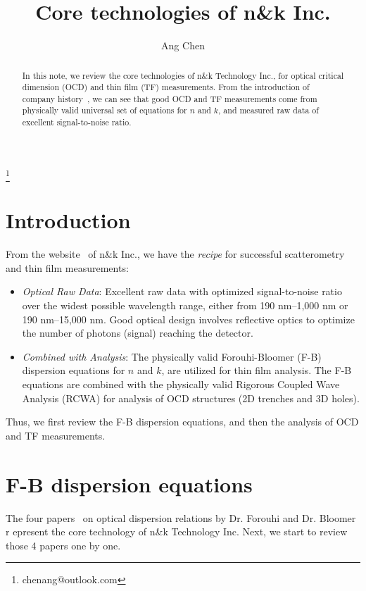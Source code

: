 \documentclass[pra,superscriptaddress,reprint]{revtex4-1}
\begin{document}
\title{\Large Core technologies of n\&k Inc.}

\author{Ang Chen}
\thanks{chenang@outlook.com}


\begin{abstract}
In this note, we review the core technologies of n\&k Technology Inc., 
for optical critical dimension (OCD) and thin film (TF) measurements.
From the introduction of company history~\cite{nkhistory}, we can see that good OCD and TF measurements come from
physically valid universal set of equations for $n$ and $k$, and measured raw data of excellent signal-to-noise ratio.
\end{abstract}

\maketitle


\section{Introduction~\label{sec:1}}
From the website~\cite{nkpremise} of n\&k Inc., we have the \textit{recipe} for successful 
scatterometry and thin film measurements:
\begin{itemize}%
\setlength{\itemsep}{2pt}
\setlength{\parsep}{0pt}
\setlength{\parskip}{0pt}
\item \textit{Optical Raw Data}: Excellent raw data with optimized signal-to-noise ratio over the widest possible wavelength range, 
either from 190 nm--1,000 nm or 190 nm--15,000 nm. Good optical design involves reflective optics to optimize the number of photons (signal) reaching the detector.
\item \textit{Combined with Analysis}: The physically valid Forouhi-Bloomer (F-B) dispersion equations for $n$ and $k$, are utilized for thin film analysis.
The F-B equations are combined with the physically valid Rigorous Coupled Wave Analysis (RCWA) for analysis of OCD structures (2D trenches and 3D holes).
\end{itemize}

Thus, we first review the F-B dispersion equations, and then the analysis of OCD and TF measurements.  

\section{F-B dispersion equations}
The four papers~\cite{forouhi1986optical,forouhi1988optical,forouhi2019new,forouhi2021optical} on optical dispersion relations by Dr. Forouhi and Dr. Bloomer r
epresent the core technology of n\&k Technology Inc.
Next, we start to review those 4 papers one by one.
\end{document}
